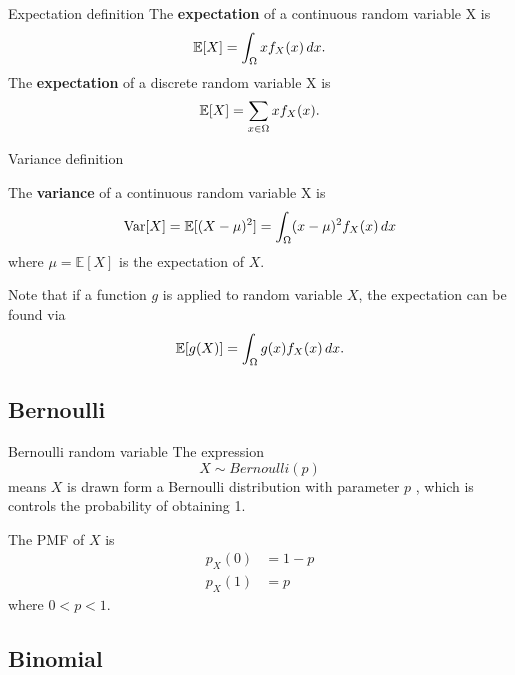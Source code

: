 \begin{fact}{Expectation definition}{}
    The \textbf{expectation} of a continuous random variable X is
    \begin{equation*}
        \mathbb{E}[X] = \int_{\Omega}xf_X(x)\,dx.
    \end{equation*}
    The \textbf{expectation} of a discrete random variable X is
    \begin{equation*}
        \mathbb{E}[X]=\sum_{x\in \Omega}x f_X(x).
    \end{equation*}
\end{fact}

\begin{fact}{Variance definition}{}

    The \textbf{variance} of a continuous random variable X is
    \begin{equation*}
        \operatorname{\mathrm{Var}}[X] = \mathbb{E}[(X-\mu)^2]=\int_{\Omega}(x-\mu)^2f_X(x)\,dx
    \end{equation*}
    where $\mu=\mathbb{E}[X]$ is the expectation of $X$.
\end{fact}

Note that if a function $g$ is applied to random variable $X$, the expectation can be found via
\begin{equation*}
  \mathbb{E}[g(X)]=\int_{\Omega}g(x)f_X(x)\,dx.
\end{equation*}

\subsection{Bernoulli}

\begin{fact}{Bernoulli random variable}{}
    The expression
    \begin{equation*}
        X \sim Bernoulli(p)
    \end{equation*}
    means $X$ is drawn form a Bernoulli distribution with parameter $p$
    , which is controls the probability of obtaining 1.

    The PMF of $X$ is
    \begin{align*}
        p_X(0) &= 1-p\\
        p_X(1) &= p
    \end{align*}
    where $0<p<1$.
\end{fact}

\subsection{Binomial}

